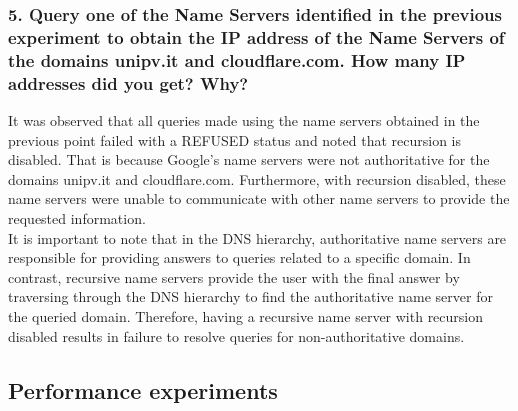 \documentclass[eng]{class}
\begin{document}
\subsubsection*{5. Query one of the Name Servers identified in the previous experiment to obtain the
    IP address of the Name Servers of the domains unipv.it and
    cloudflare.com. How many IP addresses did you get? Why?}
It was observed that all queries made using the name servers obtained in the previous point failed with a REFUSED status and noted that recursion is disabled.
That is because Google's name servers were not authoritative for the domains unipv.it and cloudflare.com.
Furthermore, with recursion disabled, these name servers were unable to communicate with other name servers to provide the requested information.\\
It is important to note that in the DNS hierarchy, authoritative name servers are responsible for providing answers to queries related to a specific domain.
In contrast, recursive name servers provide the user with the final answer by traversing through the DNS hierarchy to find the authoritative name server for the queried domain.
Therefore, having a recursive name server with recursion disabled results in failure to resolve queries for non-authoritative domains.
\subsection{Performance experiments}
\end{document}
